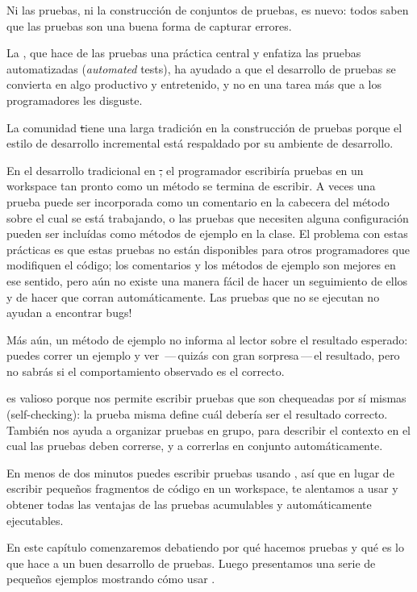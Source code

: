 \documentclass[a4paper,10pt,twoside]{book}
\begin{document}
Ni las pruebas, ni la construcci\'on de conjuntos de pruebas, es nuevo:  todos saben que  las pruebas son una buena forma de capturar errores.

La \mbox{,} que hace de las pruebas una pr\'actica central
y enfatiza las pruebas automatizadas (\emph{automated} tests), 
ha ayudado a que el desarrollo de pruebas se convierta en algo productivo y entretenido, y no en una tarea m\'as que a los programadores les disguste.

La comunidad \st tiene una larga tradici\'on en la construcci\'on de pruebas porque el estilo de desarrollo incremental est\'a respaldado por su ambiente de desarrollo.
  
En el desarrollo tradicional en \st , el programador escribir\'ia pruebas en un workspace 
tan pronto como un m\'etodo se termina de escribir.
A veces una prueba puede ser incorporada como un comentario en la cabecera
del m\'etodo sobre el cual se est\'a trabajando,
o las pruebas que necesiten alguna configuraci\'on pueden ser inclu\'idas como m\'etodos de ejemplo en la clase.
El problema con estas pr\'acticas es que estas pruebas no est\'an
disponibles para otros programadores que modifiquen el c\'odigo; los comentarios y los m\'etodos de ejemplo son mejores en ese sentido, pero a\'un no existe una manera f\'acil de hacer un seguimiento de ellos y de hacer que corran autom\'aticamente. Las pruebas que no se ejecutan no ayudan a encontrar bugs!

M\'as a\'un, un m\'etodo de ejemplo no informa al lector sobre el resultado esperado:
puedes correr un ejemplo y ver \,---\,quiz\'as con gran sorpresa\,---\,el resultado, 
pero no sabr\'as si el comportamiento observado es el correcto.

\sunit es valioso porque nos permite escribir pruebas que son chequeadas por s\'i mismas (self-checking):
la prueba misma define cu\'al deber\'ia ser el resultado correcto.
Tambi\'en nos ayuda a organizar pruebas en grupo, para describir el contexto en el cual las pruebas deben correrse,
 y a correrlas en conjunto autom\'aticamente.

En menos de dos minutos puedes escribir pruebas usando \sunit, as\'i que en lugar de escribir peque\~nos fragmentos de c\'odigo en un workspace, te alentamos a usar \sunit y obtener todas las ventajas de las pruebas acumulables y autom\'aticamente ejecutables.

En este cap\'itulo comenzaremos debatiendo por qu\'e hacemos pruebas y qu\'e es lo que hace a un buen desarrollo de pruebas. Luego presentamos una serie de peque\~nos ejemplos mostrando c\'omo usar \sunit.
\end{document}
